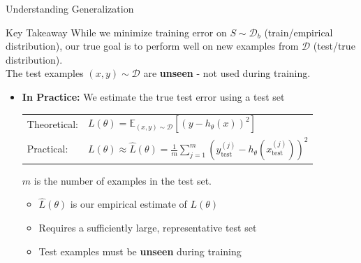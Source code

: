 \documentclass{beamer}
\begin{document}
\begin{frame}{Understanding Generalization}
    \begin{block}{Key Takeaway}
         While we minimize training error on $S \sim \mathcal{D}_b$ (train/empirical distribution), our true goal is to perform well on new examples from $\mathcal{D}$ (test/true distribution). \\
        The test examples $(x,y)\sim \mathcal{D}$ are \textbf{unseen} - not used during training.
    \end{block}

    \begin{itemize}
    \item \textbf{In Practice:} We estimate the true test error using a test set
    
    \vspace{0.3cm}
    
    \begin{minipage}{\linewidth}
    \centering
    \begin{tabular}{ll}
    Theoretical: & $L(\theta) = \mathbb{E}_{(x,y)\sim\mathcal{D}}[(y - h_\theta(x))^2]$ \\
    Practical: &  $L(\theta) \approx \widehat{L}(\theta) = \frac{1}{m}\sum\limits_{j=1}^m (y^{(j)}_{\text{test}} - h_\theta(x^{(j)}_{\text{test}}))^2$ \\
    \end{tabular}
    \end{minipage}

    $m$ is the number of examples in the test set.
    
    \vspace{0.3cm}
    
    \begin{itemize}
        \item $\widehat{L}(\theta)$ is our empirical estimate of $L(\theta)$
        \item Requires a sufficiently large, representative test set
        \item Test examples must be \textbf{unseen} during training
    \end{itemize}
\end{itemize}
\end{frame}
\end{document}
